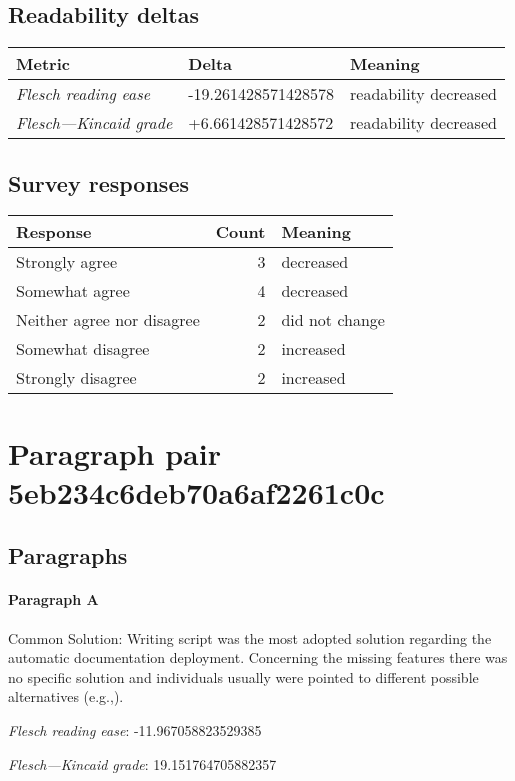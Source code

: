 \subsection{Readability deltas}

\begin{tabular}{lll}
\toprule
               \textbf{Metric} &       \textbf{Delta} &       \textbf{Meaning} \\
\midrule
    \emph{Flesch reading ease} &  -19.261428571428578 &  readability decreased \\
 \emph{Flesch---Kincaid grade} &   +6.661428571428572 &  readability decreased \\
\bottomrule
\end{tabular}

\subsection{Survey responses}
\begin{tabular}{lrl}
\toprule
          \textbf{Response} &  \textbf{Count} & \textbf{Meaning} \\
\midrule
             Strongly agree &               3 &        decreased \\
             Somewhat agree &               4 &        decreased \\
 Neither agree nor disagree &               2 &   did not change \\
          Somewhat disagree &               2 &        increased \\
          Strongly disagree &               2 &        increased \\
\bottomrule
\end{tabular}

\section{Paragraph pair 5eb234c6deb70a6af2261c0c}
\subsection{Paragraphs}
\paragraph{Paragraph A}
Common Solution: Writing script was the most adopted solution regarding the automatic documentation deployment. Concerning the missing features there was no specific solution and individuals usually were pointed to different possible alternatives (e.g.,).\par\medskip\emph{Flesch reading ease}: -11.967058823529385\par\emph{Flesch---Kincaid grade}: 19.151764705882357

